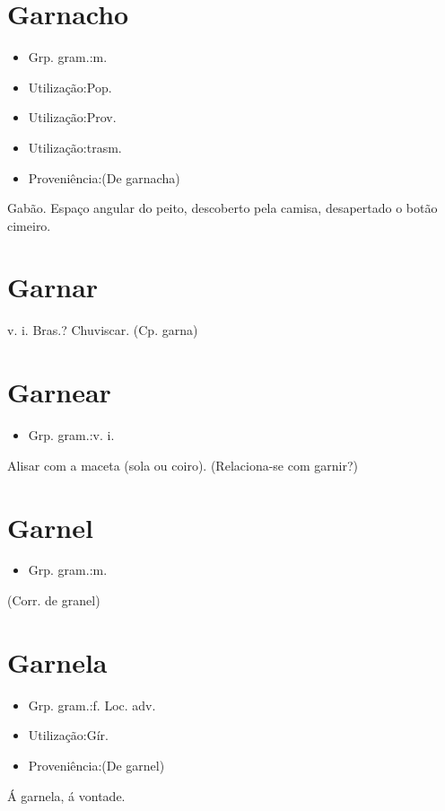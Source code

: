 \section{Garnacho}
\begin{itemize}
\item {Grp. gram.:m.}
\end{itemize}
\begin{itemize}
\item {Utilização:Pop.}
\end{itemize}
\begin{itemize}
\item {Utilização:Prov.}
\end{itemize}
\begin{itemize}
\item {Utilização:trasm.}
\end{itemize}
\begin{itemize}
\item {Proveniência:(De \textunderscore garnacha\textunderscore )}
\end{itemize}
Gabão.
Espaço angular do peito, descoberto pela camisa, desapertado o botão cimeiro.
\section{Garnar}
\textunderscore v. i. Bras.\textunderscore ?
Chuviscar.
(Cp. \textunderscore garna\textunderscore )
\section{Garnear}
\begin{itemize}
\item {Grp. gram.:v. i.}
\end{itemize}
Alisar com a maceta (sola ou coiro).
(Relaciona-se com \textunderscore garnir\textunderscore ?)
\section{Garnel}
\begin{itemize}
\item {Grp. gram.:m.}
\end{itemize}
(Corr. de \textunderscore granel\textunderscore )
\section{Garnela}
\begin{itemize}
\item {Grp. gram.:f. Loc. adv.}
\end{itemize}
\begin{itemize}
\item {Utilização:Gír.}
\end{itemize}
\begin{itemize}
\item {Proveniência:(De \textunderscore garnel\textunderscore )}
\end{itemize}
\textunderscore Á garnela\textunderscore , á vontade.
